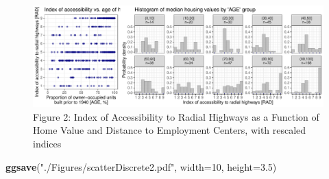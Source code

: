 \documentclass[
]{article}
\newenvironment{Shaded}{\begin{snugshade}}{\end{snugshade}}
\newcommand{\AttributeTok}[1]{\textcolor[rgb]{0.13,0.29,0.53}{#1}}
\newcommand{\DecValTok}[1]{\textcolor[rgb]{0.00,0.00,0.81}{#1}}
\newcommand{\FloatTok}[1]{\textcolor[rgb]{0.00,0.00,0.81}{#1}}
\newcommand{\FunctionTok}[1]{\textcolor[rgb]{0.13,0.29,0.53}{\textbf{#1}}}
\newcommand{\NormalTok}[1]{#1}
\newcommand{\StringTok}[1]{\textcolor[rgb]{0.31,0.60,0.02}{#1}}
\begin{document}
\begin{figure}[H]

{\centering \includegraphics{IntroductionSLGP_files/figure-latex/figureHousing2-1} 

}

\caption{Figure 2: Index of Accessibility to Radial Highways as a Function of Home Value and Distance to Employment Centers, with rescaled indices}\label{fig:figureHousing2}
\end{figure}

\begin{Shaded}
\begin{Highlighting}[]
\FunctionTok{ggsave}\NormalTok{(}\StringTok{"./Figures/scatterDiscrete2.pdf"}\NormalTok{, }\AttributeTok{width=}\DecValTok{10}\NormalTok{, }\AttributeTok{height=}\FloatTok{3.5}\NormalTok{)}
\end{Highlighting}
\end{Shaded}
\end{document}
